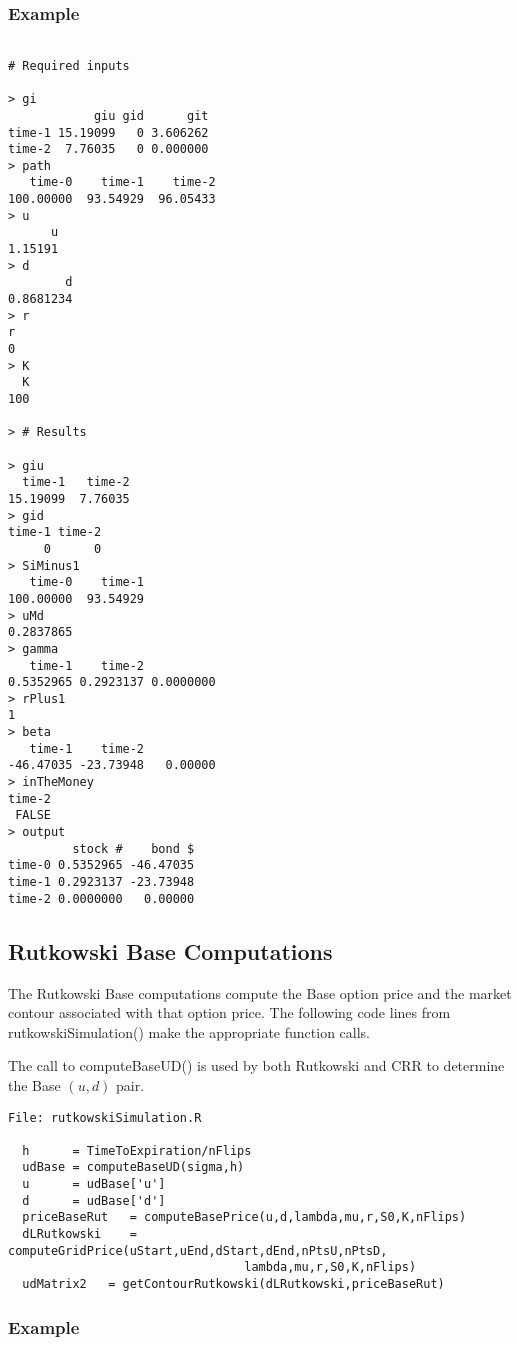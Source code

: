 \documentclass[10pt]{article}
\begin{document}
\subsubsection*{Example}

\begin{verbatim}

# Required inputs

> gi
            giu gid      git
time-1 15.19099   0 3.606262
time-2  7.76035   0 0.000000
> path
   time-0    time-1    time-2
100.00000  93.54929  96.05433
> u
      u
1.15191
> d
        d
0.8681234
> r
r
0
> K
  K
100

> # Results

> giu
  time-1   time-2
15.19099  7.76035
> gid
time-1 time-2
     0      0
> SiMinus1
   time-0    time-1
100.00000  93.54929
> uMd
0.2837865
> gamma
   time-1    time-2
0.5352965 0.2923137 0.0000000
> rPlus1
1
> beta
   time-1    time-2
-46.47035 -23.73948   0.00000
> inTheMoney
time-2
 FALSE
> output
         stock #    bond $
time-0 0.5352965 -46.47035
time-1 0.2923137 -23.73948
time-2 0.0000000   0.00000
\end{verbatim}


\subsection*{Rutkowski Base Computations}
The Rutkowski Base computations compute the Base option price and the market contour associated with that option price.
The following code lines from rutkowskiSimulation() make the appropriate function calls.

The call to computeBaseUD() is used by both Rutkowski and CRR to determine the Base $(u,d)$ pair.

\begin{verbatim}
File: rutkowskiSimulation.R

  h      = TimeToExpiration/nFlips
  udBase = computeBaseUD(sigma,h)
  u      = udBase['u']
  d      = udBase['d']
  priceBaseRut   = computeBasePrice(u,d,lambda,mu,r,S0,K,nFlips)
  dLRutkowski    = computeGridPrice(uStart,uEnd,dStart,dEnd,nPtsU,nPtsD,
                                 lambda,mu,r,S0,K,nFlips)
  udMatrix2   = getContourRutkowski(dLRutkowski,priceBaseRut)
\end{verbatim}

\subsubsection*{Example}
\end{document}
